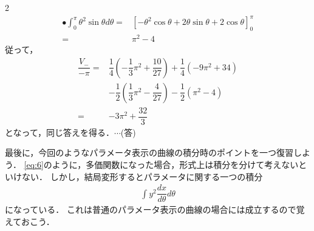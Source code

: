 \documentclass[../../main.tex]{subfiles}
\begin{document}
\begin{multicols}{2}
\begin{align}
    \bullet \int_0^\pi \theta^2 \sin \theta d\theta
    = & \left[ - \theta^2 \cos \theta + 2 \theta \sin \theta + 2\cos \theta \right]_0^\pi                \\
    = & \pi^2 -4
  \end{align}
  従って，
  \begin{align}
    \dfrac{V_{-}}{-\pi}
    = & \dfrac{1}{4}\left(-\dfrac{1}{3}\pi^2 + \dfrac{10}{27}\right) + \dfrac{1}{4}(-9\pi^2+34)          \\
    & - \dfrac{1}{2}\left(\dfrac{1}{3}\pi^2 - \dfrac{4}{27}\right) - \dfrac{1}{2}\left(\pi^2 -4\right) \\
    = & -3\pi^2 + \dfrac{32}{3}
  \end{align}
  となって，同じ答えを得る．$\cdots$(答)

  最後に，今回のようなパラメータ表示の曲線の積分時のポイントを一つ復習しよう．
  \cref{eq:6}のように，多価関数になった場合，形式上は積分を分けて考えないといけない．
  しかし，結局変形するとパラメータに関する一つの積分
  \begin{align}
    \int y^2\dfrac{dx}{d\theta} d\theta
  \end{align}
  になっている．
  これは普通のパラメータ表示の曲線の場合には成立するので覚えておこう．

  \newpage
\end{multicols}
\end{document}

